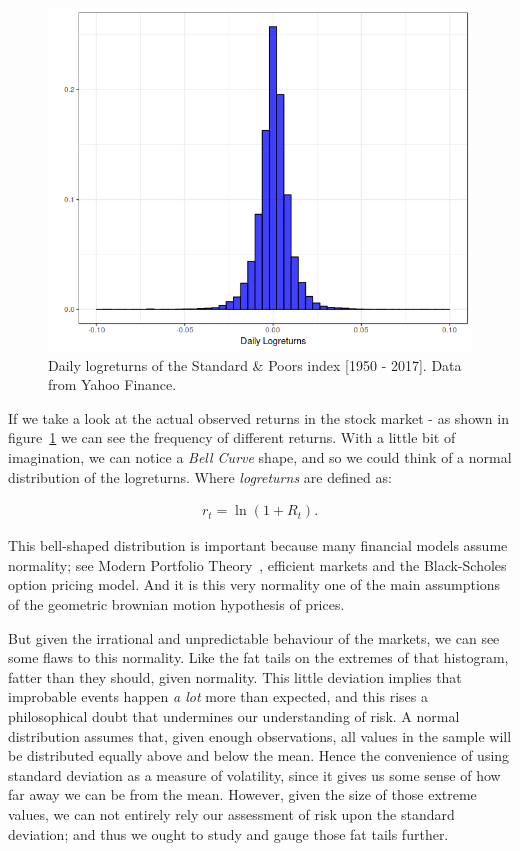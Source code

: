 \begin{figure}
    \centering
    \includegraphics[scale=0.65]{./images/sp_hist.png}
    \caption{Daily logreturns of the Standard \& Poors index [1950 - 2017]. Data from Yahoo Finance.}
    \label{fig:daily-logreturns-sp}
\end{figure}

If we take a look at the actual observed returns in the stock market - as shown in figure~\ref{fig:daily-logreturns-sp} we can see the frequency of different returns. With a little bit of imagination, we can notice a \textit{Bell Curve} shape, and so we could  think of a normal distribution of the logreturns. Where \textit{logreturns} are defined as:

\begin{align} \label{eq:logreturn}
    r_t = \ln{(1+R_t)}\textit{.}
\end{align}

This bell-shaped distribution is important because many financial models assume normality; see Modern Portfolio Theory~\cite{a:markowitz-portfolio}, efficient markets and the Black-Scholes option pricing model. And it is this very normality one of the main assumptions of the geometric brownian motion hypothesis of prices.

But given the irrational and unpredictable behaviour of the markets, we can see some flaws to this normality. Like the fat tails on the extremes of that histogram, fatter than they should, given normality. This little deviation implies that improbable events happen \textit{a lot} more than expected, and this rises a philosophical doubt that undermines our understanding of risk. A normal distribution assumes that, given enough observations, all values in the sample will be distributed equally above and below the mean. Hence the convenience of using standard deviation as a measure of volatility, since it gives us some sense of how far away we can be from the mean. However, given the size of those extreme values, we can not entirely rely our assessment of risk upon the standard deviation; and thus we ought to study and gauge those fat tails further.


